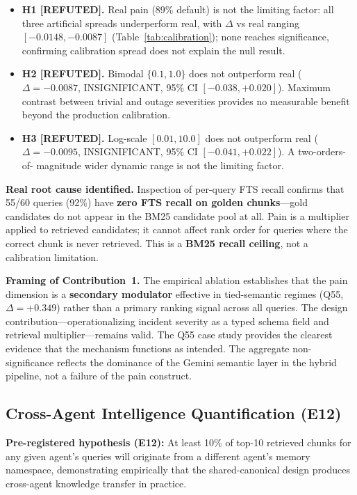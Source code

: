 \begin{itemize}
  \item \textbf{H1 [REFUTED].} Real pain (89\% default) is not the limiting factor:
    all three artificial spreads underperform real, with $\Delta$ vs real ranging
    $[-0.0148, -0.0087]$ (Table~\ref{tab:calibration}); none reaches significance,
    confirming calibration spread does not explain the null result.
  \item \textbf{H2 [REFUTED].} Bimodal $\{0.1, 1.0\}$ does not outperform real
    ($\Delta = -0.0087$, INSIGNIFICANT, 95\% CI $[-0.038, +0.020]$). Maximum contrast
    between trivial and outage severities provides no measurable benefit beyond the
    production calibration.
  \item \textbf{H3 [REFUTED].} Log-scale $[0.01, 10.0]$ does not outperform real
    ($\Delta = -0.0095$, INSIGNIFICANT, 95\% CI $[-0.041, +0.022]$). A two-orders-of-
    magnitude wider dynamic range is not the limiting factor.
\end{itemize}

\textbf{Real root cause identified.} Inspection of per-query FTS recall confirms that
55/60 queries (92\%) have \textbf{zero FTS recall on golden chunks}---gold candidates do
not appear in the BM25 candidate pool at all. Pain is a multiplier applied to retrieved
candidates; it cannot affect rank order for queries where the correct chunk is never
retrieved. This is a \textbf{BM25 recall ceiling}, not a calibration limitation.

\textbf{Framing of Contribution~1.} The empirical ablation establishes that the pain
dimension is a \textbf{secondary modulator} effective in tied-semantic regimes
(Q55, $\Delta = +0.349$) rather than a primary ranking signal across all queries. The
design contribution---operationalizing incident severity as a typed schema field and
retrieval multiplier---remains valid. The Q55 case study provides the clearest evidence
that the mechanism functions as intended. The aggregate non-significance reflects the
dominance of the Gemini semantic layer in the hybrid pipeline, not a failure of the pain
construct.

\subsection{Cross-Agent Intelligence Quantification (E12)}

\textbf{Pre-registered hypothesis (E12):} At least 10\% of top-10 retrieved chunks for
any given agent's queries will originate from a different agent's memory namespace,
demonstrating empirically that the shared-canonical design produces cross-agent knowledge
transfer in practice.

